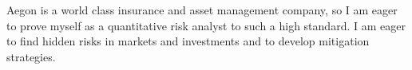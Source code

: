 \documentclass[12pt,a4paper,sans]{moderncv} %
\begin{document}
Aegon is a world class insurance and asset management company, so I am eager to prove myself as a quantitative risk analyst to such a high standard.
I am eager to find hidden risks in markets and investments and to develop mitigation strategies.
\vspace{0.25cm}
\end{document}
